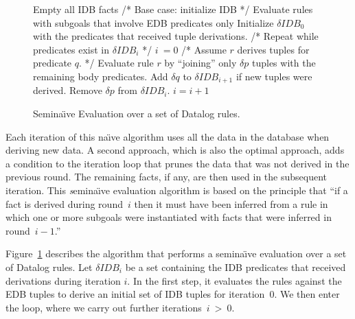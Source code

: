 \begin{figure}
\ssp
\begin{boxedminipage}{\linewidth}
    \begin{algorithmic}[1]
      	\STATE Empty all IDB facts
	\STATE /* Base case: initialize IDB */
        \STATE Evaluate rules with subgoals that involve EDB predicates only
	\STATE Initialize $\delta IDB_0$ with the predicates that received tuple derivations.
	\STATE /* Repeat while predicates exist in $\delta IDB_i$ */
	\STATE $i\ = 0$
                	\STATE /* Assume $r$ derives tuples for predicate $q$.  */
			\STATE Evaluate rule $r$ by ``joining'' only $\delta p$ tuples with the remaining body predicates. 
			\STATE Add $\delta q$ to $\delta IDB_{i+1}$ if new tuples were derived.
			\STATE Remove $\delta p$ from $\delta IDB_i$.
        	\ENDFOR
        \ENDFOR
	\STATE $i = i + 1$
	\ENDWHILE
    \end{algorithmic}
\end{boxedminipage}
\caption{\label{ch:p2:fig:seminaive}Semina\"{\i}ve Evaluation over a set of Datalog rules.}
\end{figure}

Each iteration of this na\"{\i}ve algorithm uses all the data in the database
when deriving new data.  A second approach, which is also the optimal approach,
adds a condition to the iteration loop that prunes the data that was not
derived in the previous round.  The remaining facts, if any, are then used in
the subsequent iteration.  This {\emph semina\"{\i}ve evaluation} algorithm is
based on the principle that ``if a fact is derived during round~$i$ then it
must have been inferred from a rule in which one or more subgoals were
instantiated with facts that were inferred in round~$i-1$.''~\cite{ullmanbook}

Figure~\ref{ch:p2:fig:seminaive} describes the algorithm that performs a
semina\"{\i}ve evaluation over a set of Datalog rules.  Let $\delta IDB_{i}$ be
a set containing the IDB predicates that received derivations during iteration
$i$.  In the first step, it evaluates the rules against the EDB tuples to
derive an initial set of IDB tuples for iteration~$0$.  We then enter the loop,
where we carry out further iterations~$i\ >\ 0$.

